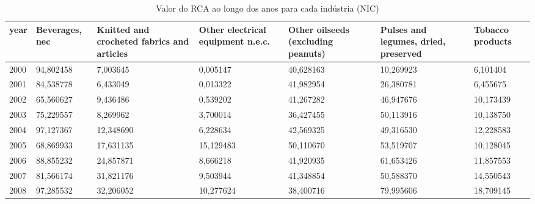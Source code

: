 \begin{table}
\centering
\caption{Valor do RCA ao longo dos anos para cada indústria (NIC)}
\begin{tabular}{p{1cm}p{2cm}p{2cm}p{2cm}p{2cm}p{2cm}p{2cm}}
\toprule
 year &  Beverages, nec &  Knitted and crocheted fabrics and articles &  Other electrical equipment n.e.c. &  Other oilseeds (excluding peanuts) &  Pulses and legumes, dried, preserved &  Tobacco products \\
\midrule
 2000 &       94,802458 &                                    7,003645 &                           0,005147 &                           40,628163 &                             10,269923 &          6,101404 \\
 2001 &       84,538778 &                                    6,433049 &                           0,013322 &                           41,982954 &                             26,380781 &          6,455675 \\
 2002 &       65,560627 &                                    9,436486 &                           0,539202 &                           41,267282 &                             46,947676 &         10,173439 \\
 2003 &       75,229557 &                                    8,269962 &                           3,700014 &                           36,427455 &                             50,113916 &         10,138750 \\
 2004 &       97,127367 &                                   12,348690 &                           6,228634 &                           42,569325 &                             49,316530 &         12,228583 \\
 2005 &       68,869933 &                                   17,631135 &                          15,129483 &                           50,110670 &                             53,519707 &         10,128045 \\
 2006 &       88,855232 &                                   24,857871 &                           8,666218 &                           41,920935 &                             61,653426 &         11,857553 \\
 2007 &       81,566174 &                                   31,821176 &                           9,503944 &                           41,348854 &                             50,588370 &         14,550543 \\
 2008 &       97,285532 &                                   32,206052 &                          10,277624 &                           38,400716 &                             79,995606 &         18,709145 \\

\end{tabular}
\end{table}
